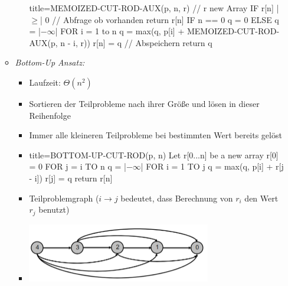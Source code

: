 \documentclass[
    12pt,
    a4paper,
    ngerman,
    color=3b,%
    marginpar=false,
    colorback=false,
    leqno,
]{tudaexercise}
\begin{document}
\begin{itemize}
\begin{itemize}
\begin{itemize}
                        \begin{ccode}[autogobble,escapeinside=||]{title={MEMOIZED-CUT-ROD-AUX(p, n, r)       // r new Array}}
                            IF r[n] |$\geq$| 0                        // Abfrage ob vorhanden
                                return r[n]
                            IF n == 0
                                q = 0
                            ELSE
                                q = |$-\infty$|
                                FOR i = 1 to n
                                q = max(q, p[i] + MEMOIZED-CUT-ROD-AUX(p, n - i, r))
                            r[n] = q                            // Abspeichern
                            return q
                            \end{ccode}
                    \end{itemize}
\pagebreak
                \item \textit{Bottom-Up Ansatz:}
                    \begin{itemize}
                        \item Laufzeit: $\Theta(n^2)$
                        \item Sortieren der Teilprobleme nach ihrer Grö\ss e und lösen in dieser Reihenfolge
                        \item Immer alle kleineren Teilprobleme bei bestimmten Wert bereits gelöst
                        \item[]
                            \begin{ccode}[autogobble,escapeinside=||]{title={BOTTOM-UP-CUT-ROD(p, n)}}
                            Let r[0...n] be a new array
                            r[0] = 0
                            FOR j = i TO n
                                q = |$-\infty$|
                                FOR i = 1 TO j
                                    q = max(q, p[i] + r[j - i])
                                r[j] = q
                            return r[n]
                            \end{ccode}
                        \item Teilproblemgraph ($i \rightarrow j$ bedeutet, dass Berechnung von $r_i$ den Wert $r_j$ benutzt)
                        \item[] \includegraphics[width=8cm]{pictures/teilproblemgraph.PNG}
                    \end{itemize}
            \end{itemize}


\end{itemize}
\end{document}
